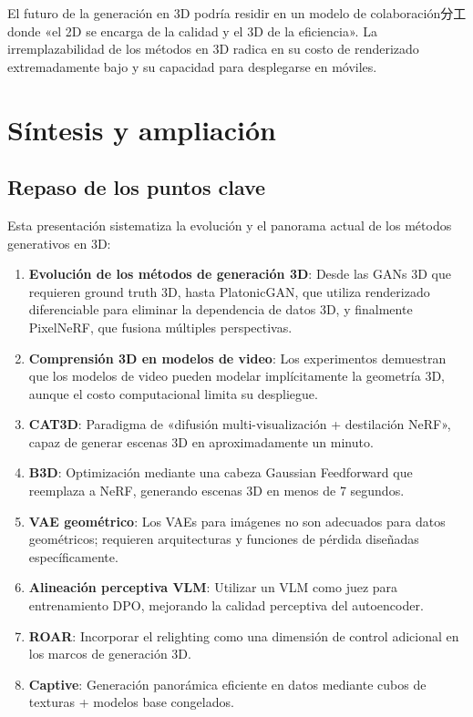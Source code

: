 \documentclass[a4paper]{article}
\begin{document}
El futuro de la generación en 3D podría residir en un modelo de colaboración分工 donde «el 2D se encarga de la calidad y el 3D de la eficiencia». La irremplazabilidad de los métodos en 3D radica en su costo de renderizado extremadamente bajo y su capacidad para desplegarse en móviles.
\section{Síntesis y ampliación}

\subsection{Repaso de los puntos clave}

Esta presentación sistematiza la evolución y el panorama actual de los métodos generativos en 3D:

\begin{enumerate}
    \item \textbf{Evolución de los métodos de generación 3D}: Desde las GANs 3D que requieren ground truth 3D, hasta PlatonicGAN, que utiliza renderizado diferenciable para eliminar la dependencia de datos 3D, y finalmente PixelNeRF, que fusiona múltiples perspectivas.
    \item \textbf{Comprensión 3D en modelos de video}: Los experimentos demuestran que los modelos de video pueden modelar implícitamente la geometría 3D, aunque el costo computacional limita su despliegue.
    \item \textbf{CAT3D}: Paradigma de «difusión multi-visualización + destilación NeRF», capaz de generar escenas 3D en aproximadamente un minuto.
    \item \textbf{B3D}: Optimización mediante una cabeza Gaussian Feedforward que reemplaza a NeRF, generando escenas 3D en menos de 7 segundos.
    \item \textbf{VAE geométrico}: Los VAEs para imágenes no son adecuados para datos geométricos; requieren arquitecturas y funciones de pérdida diseñadas específicamente.
    \item \textbf{Alineación perceptiva VLM}: Utilizar un VLM como juez para entrenamiento DPO, mejorando la calidad perceptiva del autoencoder.
    \item \textbf{ROAR}: Incorporar el relighting como una dimensión de control adicional en los marcos de generación 3D.
    \item \textbf{Captive}: Generación panorámica eficiente en datos mediante cubos de texturas + modelos base congelados.
\end{enumerate}
\end{document}
